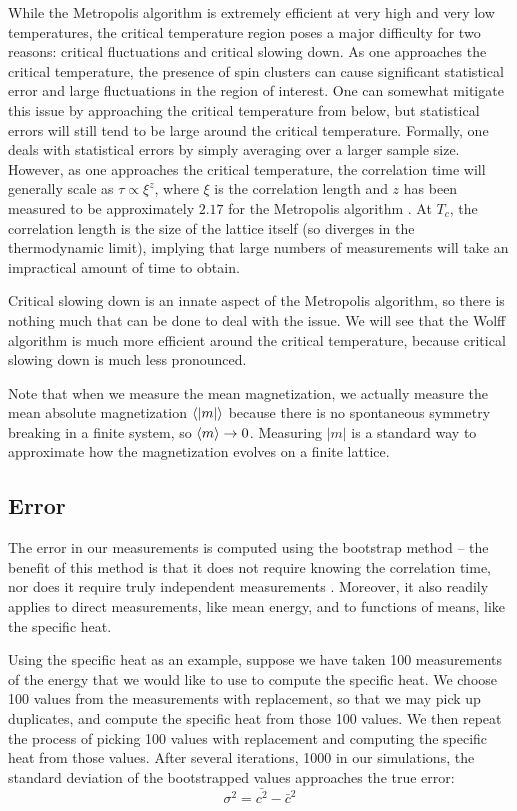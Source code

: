 \documentclass[twocolumn,aps]{revtex4-1} %
\begin{document}
While the Metropolis algorithm is extremely efficient at very high and very low temperatures, the critical temperature region poses a major difficulty for two reasons: critical fluctuations and critical slowing down. As one approaches the critical temperature, the presence of spin clusters can cause significant statistical error and large fluctuations in the region of interest. One can somewhat mitigate this issue by approaching the critical temperature from below, but statistical errors will still tend to be large around the critical temperature. Formally, one deals with statistical errors by simply averaging over a larger sample size. However, as one approaches the critical temperature, the correlation time will generally scale as $\tau \propto \xi^z$, where $\xi$ is the correlation length and $z$ has been measured to be approximately $2.17$ for the Metropolis algorithm \cite{critexp}. At $T_c$, the correlation length is the size of the lattice itself (so diverges in the thermodynamic limit), implying that large numbers of measurements will take an impractical amount of time to obtain.

Critical slowing down is an innate aspect of the Metropolis algorithm, so there is nothing much that can be done to deal with the issue. We will see that the Wolff algorithm is much more efficient around the critical temperature, because critical slowing down is much less pronounced.

Note that when we measure the mean magnetization, we actually measure the mean absolute magnetization $\braket{|m|}$ because there is no spontaneous symmetry breaking in a finite system, so $\braket{m} \to 0$. Measuring $|m|$ is a standard way to approximate how the magnetization evolves on a finite lattice.

\subsection{Error}
The error in our measurements is computed using the bootstrap method -- the benefit of this method is that it does not require knowing the correlation time, nor does it require truly independent measurements \cite{mcmethods}. Moreover, it also readily applies to direct measurements, like mean energy, and to functions of means, like the specific heat.

Using the specific heat as an example, suppose we have taken 100 measurements of the energy that we would like to use to compute the specific heat. We choose 100 values from the measurements with replacement, so that we may pick up duplicates, and compute the specific heat from those 100 values. We then repeat the process of picking 100 values with replacement and computing the specific heat from those values. After several iterations, 1000 in our simulations, the standard deviation of the bootstrapped values approaches the true error:
\begin{equation}
\sigma^2 = \bar{c^2} - \bar{c}^2
\end{equation}
\end{document}
